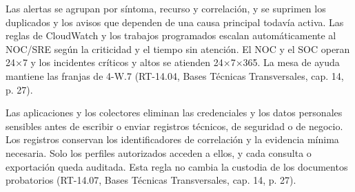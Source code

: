 Las alertas se agrupan por síntoma, recurso y correlación, y se suprimen los duplicados y los avisos que dependen de una causa principal todavía activa. Las reglas de CloudWatch y los trabajos programados escalan automáticamente al NOC/SRE según la criticidad y el tiempo sin atención. El NOC y el SOC operan 24×7 y los incidentes críticos y altos se atienden 24×7×365. La mesa de ayuda mantiene las franjas de 4-W.7 (RT-14.04, Bases Técnicas Transversales, cap. 14, p. 27).

Las aplicaciones y los colectores eliminan las credenciales y los datos personales sensibles antes de escribir o enviar registros técnicos, de seguridad o de negocio. Los registros conservan los identificadores de correlación y la evidencia mínima necesaria. Solo los perfiles autorizados acceden a ellos, y cada consulta o exportación queda auditada. Esta regla no cambia la custodia de los documentos probatorios (RT-14.07, Bases Técnicas Transversales, cap. 14, p. 27).

\label{fuente-04-capas-de-la-arquitectura-fin}
